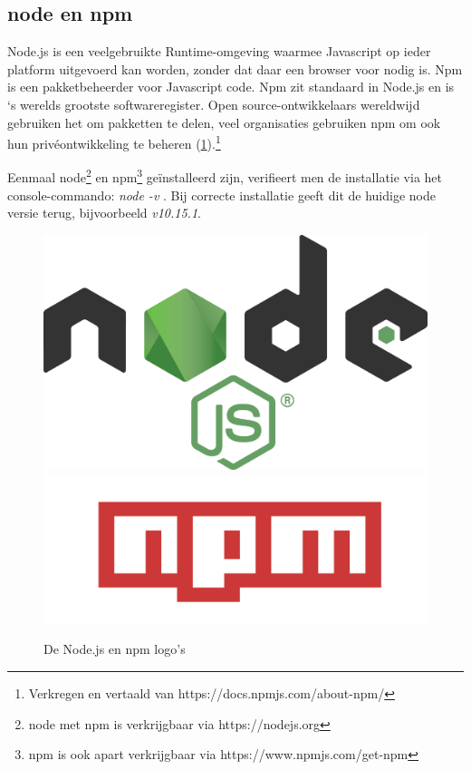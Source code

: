 \subsection{ node en npm}
Node.js is een veelgebruikte Runtime-omgeving waarmee Javascript op ieder platform uitgevoerd kan worden, zonder dat daar een browser voor nodig is. Npm is een pakketbeheerder voor Javascript code. Npm zit standaard in Node.js en is `s werelds grootste softwareregister. Open source-ontwikkelaars wereldwijd gebruiken het om pakketten te delen, veel organisaties gebruiken npm om ook hun privéontwikkeling te beheren (\ref{fig:nodejs}).\footnote{Verkregen en vertaald van https://docs.npmjs.com/about-npm/}

Eenmaal node\footnote{node met npm is verkrijgbaar via https://nodejs.org} en npm\footnote{npm is ook apart verkrijgbaar via https://www.npmjs.com/get-npm} geïnstalleerd zijn, verifieert men de installatie via het console-commando: \textit{node -v} . Bij correcte installatie geeft dit de huidige node versie terug, bijvoorbeeld \textit{v10.15.1}. 

\begin{figure}
	\includegraphics[width=\linewidth/2]{img/nodejs.png}
	\includegraphics[width=\linewidth/2]{img/npm.png}
	\caption{De Node.js en npm logo's}
	\label{fig:nodejs}
\end{figure}

